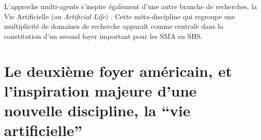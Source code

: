 L'approche multi-agents s'inspire également d'une autre branche de recherches, la Vie Artificielle (ou \textit{Artificial Life}) \autocite[28]{Ferber1995}. Cette méta-discipline qui regroupe une multiplicité de domaines de recherche apparaît comme centrale dans la constitution d'un second foyer important pour les SMA en SHS.






\section{Le deuxième foyer américain, et l'inspiration majeure d'une nouvelle discipline, la \enquote{vie artificielle}}
\label{sec:vie_artificielle}


